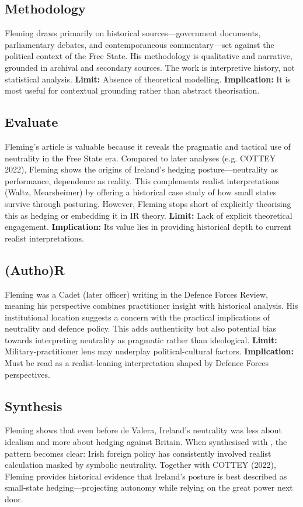 \subsection*{Methodology}
Fleming draws primarily on historical sources—government documents, parliamentary debates, and contemporaneous commentary—set against the political context of the Free State. His methodology is qualitative and narrative, grounded in archival and secondary sources. The work is interpretive history, not statistical analysis.  
\textbf{Limit:} Absence of theoretical modelling.  
\textbf{Implication:} It is most useful for contextual grounding rather than abstract theorisation.

\subsection*{Evaluate}
Fleming’s article is valuable because it reveals the pragmatic and tactical use of neutrality in the Free State era. Compared to later analyses (e.g. COTTEY 2022), Fleming shows the origins of Ireland’s hedging posture—neutrality as performance, dependence as reality. This complements realist interpretations (Waltz, Mearsheimer) by offering a historical case study of how small states survive through posturing. However, Fleming stops short of explicitly theorising this as hedging or embedding it in IR theory.  
\textbf{Limit:} Lack of explicit theoretical engagement.  
\textbf{Implication:} Its value lies in providing historical depth to current realist interpretations.

\subsection*{(Autho)R}
Fleming was a Cadet (later officer) writing in the Defence Forces Review, meaning his perspective combines practitioner insight with historical analysis. His institutional location suggests a concern with the practical implications of neutrality and defence policy. This adds authenticity but also potential bias towards interpreting neutrality as pragmatic rather than ideological.  
\textbf{Limit:} Military-practitioner lens may underplay political-cultural factors.  
\textbf{Implication:} Must be read as a realist-leaning interpretation shaped by Defence Forces perspectives.

\subsection*{Synthesis}
Fleming shows that even before de Valera, Ireland’s neutrality was less about idealism and more about hedging against Britain. When synthesised with \parencite{FANNING_2015,AYIOTIS_2023}, the pattern becomes clear: Irish foreign policy has consistently involved realist calculation masked by symbolic neutrality. Together with COTTEY (2022), Fleming provides historical evidence that Ireland’s posture is best described as small-state hedging—projecting autonomy while relying on the great power next door.



